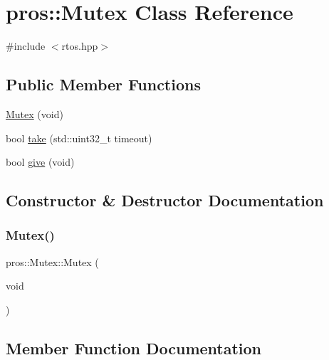 \hypertarget{classpros_1_1Mutex}{}\section{pros\+:\+:Mutex Class Reference}
\label{classpros_1_1Mutex}


{\ttfamily \#include $<$rtos.\+hpp$>$}

\subsection*{Public Member Functions}
\begin{DoxyCompactItemize}
\item 
\hyperlink{classpros_1_1Mutex_a96d568fada90acb8b79d82a3687f8f18}{Mutex} (void)
\item 
bool \hyperlink{classpros_1_1Mutex_a70da733375f7b4b68475881578c78516}{take} (std\+::uint32\+\_\+t timeout)
\item 
bool \hyperlink{classpros_1_1Mutex_a1c3e7ee193608a27a5a509ee7930363b}{give} (void)
\end{DoxyCompactItemize}


\subsection{Constructor \& Destructor Documentation}
\mbox{\label{classpros_1_1Mutex_a96d568fada90acb8b79d82a3687f8f18}} 
\subsubsection{\texorpdfstring{Mutex()}{Mutex()}}
{\footnotesize\ttfamily pros\+::\+Mutex\+::\+Mutex (\begin{DoxyParamCaption}\item[{void}]{ }\end{DoxyParamCaption})}



\subsection{Member Function Documentation}
\mbox{\label{classpros_1_1Mutex_a1c3e7ee193608a27a5a509ee7930363b}} 
